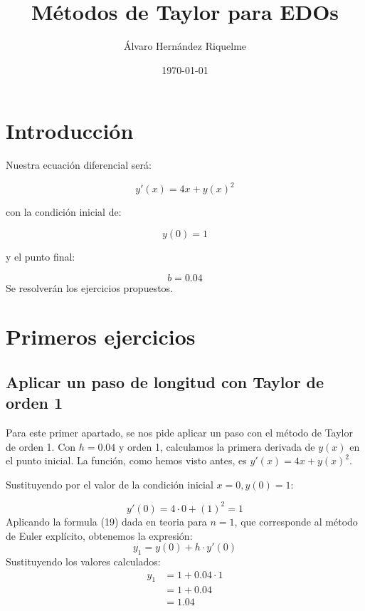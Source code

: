 \documentclass{article}
\title{Métodos de Taylor para EDOs}
\author{Álvaro Hernández Riquelme}
\date{\today}
\begin{document}

\maketitle
\tableofcontents
\newpage

\section{Introducción}

Nuestra ecuación diferencial será:

\begin{equation}
y'(x) = 4x + y(x)^2
\end{equation}

con la condición inicial de:

\begin{equation}
y(0) = 1
\end{equation}

y el punto final:

\begin{equation}
b = 0.04
\end{equation}
Se resolverán los ejercicios propuestos.

\section{Primeros ejercicios}

\subsection{Aplicar un paso de longitud con Taylor de orden 1}

Para este primer apartado, se nos pide aplicar un paso con el método de Taylor de orden 1.
Con $h=0.04$ y orden 1, calculamos la primera derivada de $y(x)$ en el punto inicial. La función, como hemos visto antes, es $y'(x) = 4x + y(x)^2$.

Sustituyendo por el valor de la condición inicial $x=0, y(0)=1$:

\begin{equation}
y'(0) = 4 \cdot 0 + (1)^2 = 1
\end{equation}
Aplicando la formula (19) dada en teoria para $n=1$, que corresponde al método de Euler explícito, obtenemos la expresión:
\begin{equation}
y_1 = y(0) + h \cdot y'(0)
\end{equation}
Sustituyendo los valores calculados:
\begin{align*}
y_1 &= 1 + 0.04 \cdot 1 \\
&= 1 + 0.04 \\
&= \boxed{1.04}
\end{align*}
\end{document}
